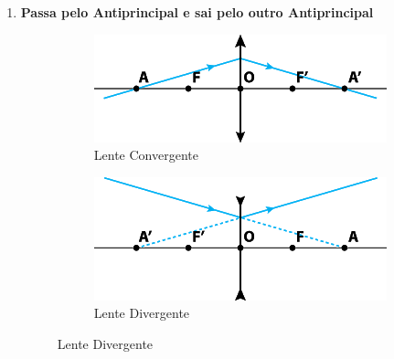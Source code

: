 \documentclass[12pt]{extarticle}
\newcommand{\<}{\langle}
\renewcommand{\>}{\rangle}
\theoremstyle{definition}
\begin{document}
\begin{enumerate}
    \item \textbf{Passa pelo Antiprincipal e sai pelo outro Antiprincipal}
    \begin{figure}[H]
        \centering
        \begin{subfigure}[b]{0.45\textwidth}
         \centering
         \includegraphics[width=\textwidth]{notaveis_conv_4.png}
         \caption{Lente Convergente}
         \label{fig:raios_conv_4}
     \end{subfigure}
     \hfill
     \begin{subfigure}[b]{0.45\textwidth}
         \centering
         \includegraphics[width=\textwidth]{notaveis_div_4.png}
         \caption{Lente Divergente}
         \label{fig:raios_div_4}
     \end{subfigure}
    \end{figure}
\end{enumerate}
\end{document}
